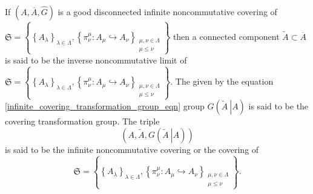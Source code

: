 \documentclass{beamer}
\theoremstyle{plain}
\newcommand{\be}{\begin{equation}}
\newcommand{\ee}{\end{equation}}
\newcommand{\la}{\lambda}
\newcommand{\La}{\Lambda}
\newcommand{\hookto}{\hookrightarrow}        %
\begin{document}
\begin{frame}
	\begin{definition}\label{infinite_noncommutative_covering_defn}
		If $\left(A, \overline{A},\widehat{G}\right)$ is a good  disconnected infinite noncommutative covering of $\mathfrak{S}=\left\{\left\{A_\la\right\}_{\la\in \La}, \left\{\pi^\mu_\nu : A_\mu \hookto A_\nu\right\}_{\substack{\mu, \nu \in \La\\\mu \le \nu}}\right\}$  then a connected component $\widetilde{A} \subset \overline{A}$ is said to be the \alert{inverse noncommutative limit of} $\mathfrak{S}=\left\{\left\{A_\la\right\}_{\la\in \La}, \left\{\pi^\mu_\nu : A_\mu \hookto A_\nu\right\}_{\substack{\mu, \nu \in \La\\\mu \le \nu}}\right\}$. The given by the equation \eqref{infinite_covering_transformation_group_eqn} group $G\left(\left.\widetilde{A}~\right| A\right)$  is said to be the \alert{covering transformation group}.  The triple
		\be\label{infinite_noncommutative_covering_eqn}
		\left(A, \widetilde{A}, G\left(\left.\widetilde{A}~\right| A\right)\right)
		\ee
		is said to be the  \alert{infinite noncommutative covering} or the  \alert{covering} of  $$\mathfrak{S}=\left\{\left\{A_\la\right\}_{\la\in \La}, \left\{\pi^\mu_\nu : A_\mu \hookto A_\nu\right\}_{\substack{\mu, \nu \in \La\\\mu \le \nu}}\right\}.$$ 
	\end{definition}
	
	\end{frame}
\end{document}
